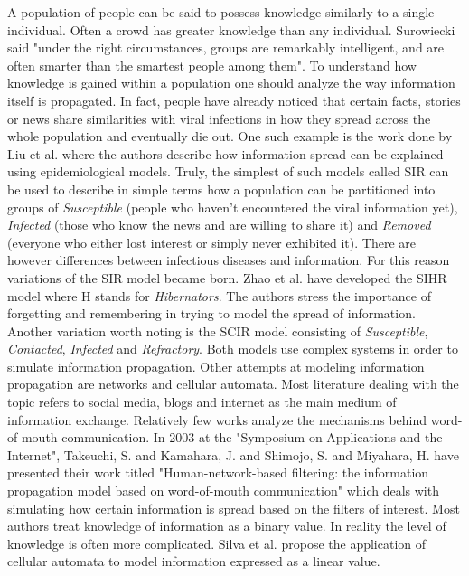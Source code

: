 A population of people can be said to possess knowledge similarly to a single individual.
Often a crowd has greater knowledge than any individual.
Surowiecki said "under the right circumstances, groups are remarkably intelligent, and are often smarter than the smartest people among them"\cite{surowiecki2005wisdom}.
To understand how knowledge is gained within a population one should analyze the way information itself is propagated.
In fact, people have already noticed that certain facts, stories or news share similarities with viral infections in how they spread across the whole population and eventually die out.
One such example is the work done by Liu et al.\cite{liu2016} where the authors describe how information spread can be explained using epidemiological models.
Truly, the simplest of such models called SIR\cite{weiss2013sir} can be used to describe in simple terms how a population can be partitioned into groups of \emph{Susceptible} (people who haven't encountered the viral information yet), \emph{Infected} (those who know the news and are willing to share it) and \emph{Removed} (everyone who either lost interest or simply never exhibited it).
There are however differences between infectious diseases and information.
For this reason variations of the SIR model became born.
Zhao et al.\cite{zhao2012sihr} have developed the SIHR model where H stands for \emph{Hibernators}.
The authors stress the importance of forgetting and remembering in trying to model the spread of information.
Another variation worth noting is the SCIR model consisting of \emph{Susceptible}, \emph{Contacted}, \emph{Infected} and \emph{Refractory}\cite{xiong2012scir}.
Both models use complex systems in order to simulate information propagation.
Other attempts at modeling information propagation are networks\cite{rodriguez2013} and cellular automata\cite{silva2020}.
Most literature dealing with the topic refers to social media, blogs and internet as the main medium of information exchange.
Relatively few works analyze the mechanisms behind word-of-mouth communication.
In 2003 at the "Symposium on Applications and the Internet", Takeuchi, S. and Kamahara, J. and Shimojo, S. and Miyahara, H. have presented their work titled "Human-network-based filtering: the information propagation model based on word-of-mouth communication" which deals with simulating how certain information is spread based on the filters of interest\cite{takeuchi1183031}.
Most authors treat knowledge of information as a binary value.
In reality the level of knowledge is often more complicated.
Silva et al.\cite{silva2020} propose the application of cellular automata to model information expressed as a linear value.

